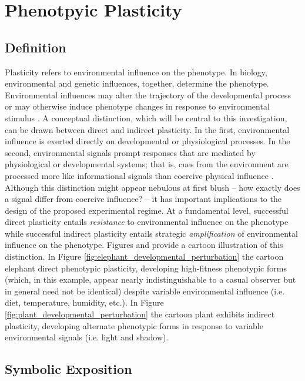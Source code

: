 \section{Phenotpyic Plasticity} \label{sec:plasticity}
\subsection{Definition}
Plasticity refers to environmental influence on the phenotype. In biology, environmental and genetic influences, together, determine the phenotype. Environmental influences may alter the trajectory of the developmental process or may otherwise induce phenotype changes in response to environmental stimulus \cite{Fusco2010PhenotypicConcepts}. A conceptual distinction, which will be central to this investigation, can be drawn between direct and indirect plasticity. In the first, environmental influence is exerted directly on developmental or physiological processes. In the second, environmental signals prompt responses that are mediated by physiological or developmental systems; that is, cues from the environment are processed more like informational signals than coercive physical influence \cite{Fusco2010PhenotypicConcepts}. Although this distinction might appear nebulous at first blush -- how exactly does a signal differ from coercive influence? -- it has important implications to the design of the proposed experimental regime. At a fundamental level, successful direct plasticity entails \textit{resistance} to environmental influence on the phenotype while successful indirect plasticity entails strategic \textit{amplification} of environmental influence on the phenotype. Figures  and  provide a cartoon illustration of this distinction. In Figure \ref{fig:elephant_developmental_perturbation} the cartoon elephant direct phenotypic plasticity, developing high-fitness phenotypic forms (which, in this example, appear nearly indistinguishable to a casual observer but in general need not be identical) despite variable environmental influence (i.e. diet, temperature, humidity, etc.). In Figure \ref{fig:plant_developmental_perturbation} the cartoon plant exhibits indirect plasticity, developing alternate phenotypic forms in response to variable environmental signals (i.e. light and shadow).

\subsection{Symbolic Exposition}

